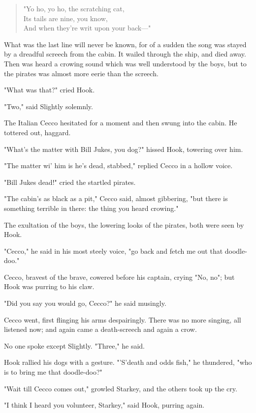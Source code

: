 \begin{verse}
	"Yo ho, yo ho, the scratching cat,\\
	Its tails are nine, you know,\\
	And when they're writ upon your back—"
\end{verse}

What was the last line will never be known,
for of a sudden the song was stayed by a dreadful screech from the cabin.
It wailed through the ship, and died away.
Then was heard a crowing sound which was well understood by the boys,
but to the pirates was almost more eerie than the screech.

"What was that?\@" cried Hook.

"Two," said Slightly solemnly.

The Italian Cecco hesitated for a moment and then swung into the cabin.
He tottered out, haggard.

"What's the matter with Bill Jukes, you dog?\@" hissed Hook, towering over him.

"The matter wi' him is he's dead, stabbed," replied Cecco in a hollow voice.

"Bill Jukes dead!\@" cried the startled pirates.

"The cabin's as black as a pit," Cecco said, almost gibbering,
"but there is something terrible in there:
the thing you heard crowing."

The exultation of the boys, the lowering looks of the pirates, both were seen by Hook.

"Cecco," he said in his most steely voice,
"go back and fetch me out that doodle-doo."

Cecco, bravest of the brave, cowered before his captain, crying "No, no";
but Hook was purring to his claw.

"Did you say you would go, Cecco?\@" he said musingly.

Cecco went, first flinging his arms despairingly.
There was no more singing, all listened now;
and again came a death-screech and again a crow.

No one spoke except Slightly.
"Three," he said.

Hook rallied his dogs with a gesture.
"'S'death and odds fish," he thundered,
"who is to bring me that doodle-doo?"

"Wait till Cecco comes out," growled Starkey,
and the others took up the cry.

"I think I heard you volunteer, Starkey," said Hook, purring again.

